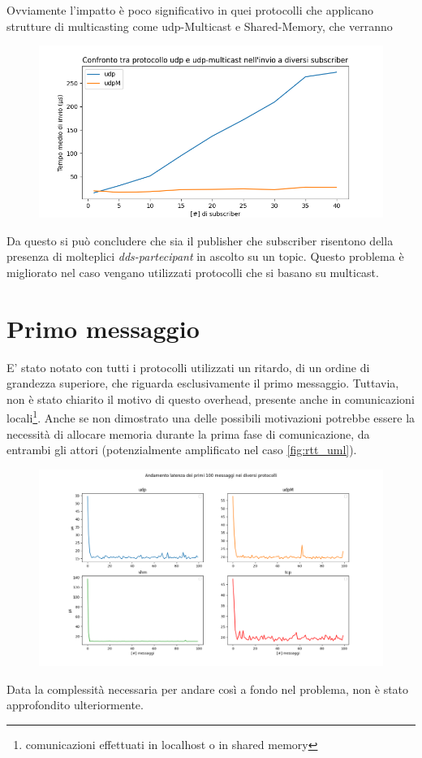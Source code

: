 Ovviamente l'impatto è poco significativo in quei protocolli che applicano strutture di \gls{multicasting} come udp-Multicast e Shared-Memory, che verranno 

\begin{figure}[H]
        \includegraphics[width=\textwidth]{./results/test3_udpvsudpM.png} 
        \caption{} %
        \label{}
\end{figure}

Da questo si può concludere che sia il publisher che subscriber risentono della presenza di molteplici \emph{dds-partecipant} in ascolto su un topic. Questo problema è migliorato nel caso vengano utilizzati protocolli che si basano su multicast. 

\section{Primo messaggio}
E' stato notato con tutti i protocolli utilizzati un ritardo, di un ordine di grandezza superiore, che riguarda esclusivamente il primo messaggio. Tuttavia, non è stato chiarito il motivo di questo \gls{overhead}, presente anche in comunicazioni locali\footnote{comunicazioni effettuati in localhost o in shared memory}. Anche se non dimostrato una delle possibili motivazioni potrebbe essere la necessità di allocare memoria durante la prima fase di comunicazione, da entrambi gli attori (potenzialmente amplificato nel caso \ref{fig:rtt_uml}). 
\begin{figure}[H]
    \includegraphics[width=\textwidth]{./results/errortest.png} 
    \caption{} %
    \label{}
\end{figure}
Data la complessità necessaria per andare così a fondo nel problema, non è stato approfondito ulteriormente.

